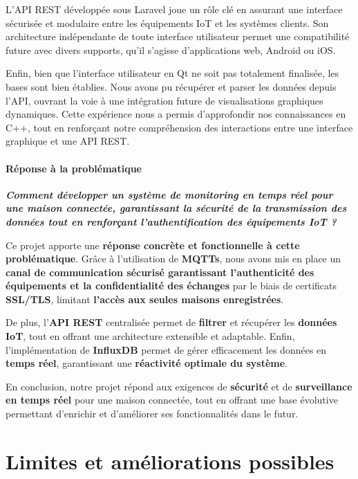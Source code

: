 \documentclass[10pt, a4paper]{report}
\begin{document}
	L’API REST développée sous Laravel joue un rôle clé en assurant une interface sécurisée et modulaire entre les équipements IoT et les systèmes clients. Son architecture indépendante de toute interface utilisateur permet une compatibilité future avec divers supports, qu’il s’agisse d’applications web, Android ou iOS.
	
	Enfin, bien que l’interface utilisateur en Qt ne soit pas totalement finalisée, les bases sont bien établies. Nous avons pu récupérer et parser les données depuis l’API, ouvrant la voie à une intégration future de visualisations graphiques dynamiques. Cette expérience nous a permis d’approfondir nos connaissances en C++, tout en renforçant notre compréhension des interactions entre une interface graphique et une API REST.\\
	
	\paragraph{Réponse à la problématique}
	\textbf{\textit{Comment développer un système de monitoring en temps réel pour une maison connectée, garantissant la sécurité de la transmission des données tout en renforçant l'authentification des équipements IoT ?}}\vspace{1cm}
	
	Ce projet apporte une \textbf{réponse concrète et fonctionnelle à cette problématique}. Grâce à l’utilisation de \textbf{MQTTs}, nous avons mis en place un \textbf{canal de communication sécurisé garantissant l’authenticité des équipements et la confidentialité des échanges} par le biais de certificats \textbf{SSL/TLS}, limitant \textbf{l’accès aux seules maisons enregistrées}.
	
	De plus, l’\textbf{API REST} centralisée permet de \textbf{filtrer} et récupérer les \textbf{données IoT}, tout en offrant une architecture extensible et adaptable. Enfin, l’implémentation de \textbf{InfluxDB} permet de gérer efficacement les données en \textbf{temps réel}, garantissant une \textbf{réactivité optimale du système}.
	
	En conclusion, notre projet répond aux exigences de \textbf{sécurité} et de \textbf{surveillance en temps réel} pour une maison connectée, tout en offrant une base évolutive permettant d’enrichir et d’améliorer ses fonctionnalités dans le futur.
	
	\section{Limites et améliorations possibles}
	
\end{document}
